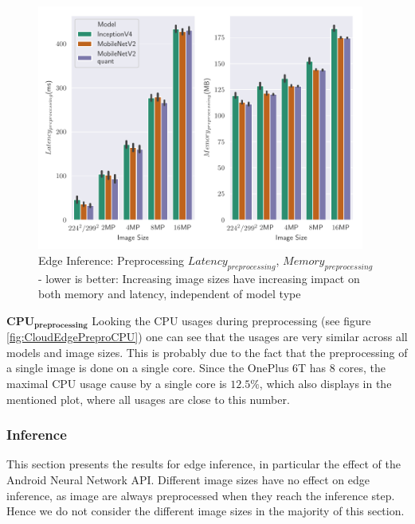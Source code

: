 
\begin{figure}[!htb]
\centering
\includegraphics[width=0.96\textwidth]{./Bilder/single_plots/edge_inference_plots/Edge_Inference_Preprocessing.pdf}
\caption[Edge Inference: Preprocessing $Latency_{preprocessing}$, $Memory_{preprocessing}$]{Edge Inference: Preprocessing $Latency_{preprocessing}$, $Memory_{preprocessing}$ -  lower is better: Increasing image sizes have increasing impact on both memory and latency, independent of model type}
\label{fig:EdgePrepro}
\end{figure}
$\mathbf{CPU_{preprocessing}}$
Looking the CPU usages during preprocessing (see figure \ref{fig:CloudEdgePreproCPU}) one can see that the usages are very similar across all models and image sizes. This is probably due to the fact that the preprocessing of a single image is done on a single core. Since the OnePlus 6T has $8$ cores, the maximal CPU usage cause by a single core is $12.5\%$, which also displays in the mentioned plot, where all usages are close to this number.

\FloatBarrier
\subsubsection{Inference}
This section presents the results for edge inference, in particular the effect of the Android Neural Network API.
Different image sizes have no effect on edge inference, as image are always preprocessed when they reach the inference step.
Hence we do not consider the different image sizes in the majority of this section.


